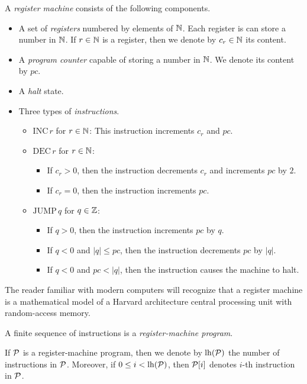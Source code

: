 \documentclass[10pt]{amsart}
\begin{document}
\begin{definition}
	A \textit{register machine} consists of the following components.
	\begin{itemize}
		\item A set of \textit{registers} numbered by elements of ${\mathbb N}$. Each register is can store a number in ${\mathbb N}$. If $r\in {\mathbb N}$ is a register, then we denote by $c_r\in {\mathbb N}$ its content.
		\item A \textit{program counter} capable of storing a number in ${\mathbb N}$. We denote its content by $pc$.
		\item A \textit{halt} state.
		\item Three types of \textit{instructions}.
		      \begin{itemize}
			      \item[] $\mathrm{INC}\,r$ for $r\in {\mathbb N}$: This instruction increments $c_r$ and $pc$.
			      \item[] $\mathrm{DEC}\,r$ for $r \in {\mathbb N}$:
				      \begin{itemize}
					      \item[] If $c_r > 0$, then the instruction decrements $c_r$ and increments $pc$ by $2$.
						      \item[]If $c_r = 0$, then the instruction increments $pc$.
				      \end{itemize}
			      \item[] $\mathrm{JUMP}\,q$ for $q \in {\mathbb Z}$:
				      \begin{itemize}
					      \item[] If $q > 0$, then the instruction increments $pc$ by $q$.
					      \item[] If $q < 0$ and $|q| \leq pc$, then the instruction decrements $pc$ by $|q|$.
					      \item[] If $q < 0$ and $pc < |q|$, then the instruction causes the machine to halt.
				      \end{itemize}
		      \end{itemize}
	\end{itemize}
\end{definition}

\begin{remark}\label{remark:register_machine_is_cpu_with_ram}
	The reader familiar with modern computers will recognize that a register machine is a mathematical model of a Harvard architecture central processing unit with random-access memory.
\end{remark}

\begin{definition}
	A finite sequence of instructions is a \textit{register-machine program}.
\end{definition}
\noindent
If ${\mathcal P}$ is a register-machine program, then we denote by $\mathrm{lh}({\mathcal P})$ the number of instructions in ${\mathcal P}$. Moreover, if $0 \leq i < \mathrm{lh}({\mathcal P})$, then ${\mathcal P}[i]$ denotes $i$-th instruction in ${\mathcal P}$.
\end{document}
